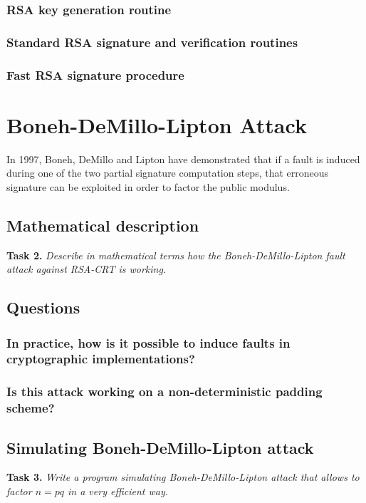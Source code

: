 \documentclass[a4paper]{report}
\begin{document}
\subsection{RSA key generation routine}

\subsection{Standard RSA signature and verification routines}

\subsection{Fast RSA signature procedure}


\chapter{Boneh-DeMillo-Lipton Attack}
In 1997, Boneh, DeMillo and Lipton have demonstrated that if a fault is induced during one of the two partial signature computation steps, that erroneous signature can be exploited in order to factor the public modulus.

\section{Mathematical description}
\textbf{Task 2.} \textit{Describe in mathematical terms how the Boneh-DeMillo-Lipton fault attack against RSA-CRT is working.}

\section{Questions}
\subsection{In practice, how is it possible to induce faults in cryptographic implementations?}
\subsection{Is this attack working on a non-deterministic padding scheme?}

\section{Simulating Boneh-DeMillo-Lipton attack}
\textbf{Task 3.} \textit{Write a program simulating Boneh-DeMillo-Lipton attack that allows to factor $n = pq$ in a very efficient way.}
\end{document}
